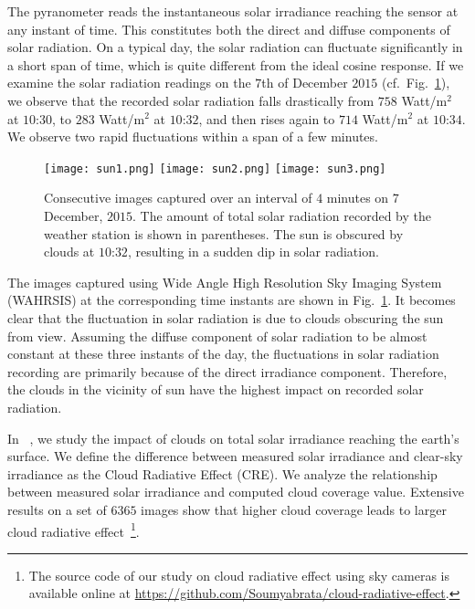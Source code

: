 The pyranometer reads the instantaneous solar irradiance reaching the sensor at any instant of time. This constitutes both the direct and diffuse components of solar radiation. On a typical day, the solar radiation can fluctuate significantly in a short span of time, which is quite different from the ideal cosine response. If we examine the solar radiation readings on the $7$th of December $2015$ (cf.\ Fig.~\ref{fig:fluctuation_example}), we observe that the recorded solar radiation falls drastically from $758$ Watt/$\mbox{m}^2$ at $10$:$30$, to $283$ Watt/$\mbox{m}^2$ at $10$:$32$, and then rises again to $714$ Watt/$\mbox{m}^2$ at $10$:$34$. We observe two rapid fluctuations within a span of a few minutes.

\begin{figure}[htb]
\begin{center}
\texttt{[image: sun1.png]}\hspace{-1mm}
\texttt{[image: sun2.png]}\hspace{-1mm}
\texttt{[image: sun3.png]}\\
\caption[Impact of clouds on direct solar irradiance.]{Consecutive images captured over an interval of $4$ minutes on $7$ December, $2015$. The amount of total solar radiation recorded by the weather station is shown in parentheses. The sun is obscured by clouds at $10$:$32$, resulting in a sudden dip in solar radiation.
\label{fig:fluctuation_example}}
\end{center}
\end{figure}

The images captured using Wide Angle High Resolution Sky Imaging System (WAHRSIS) at the corresponding time instants are shown in Fig.~\ref{fig:fluctuation_example}. It becomes clear that the fluctuation in solar radiation is due to clouds obscuring the sun from view. Assuming the diffuse component of solar radiation to be almost constant at these three instants of the day, the fluctuations in solar radiation recording are primarily because of the direct irradiance component. Therefore, the clouds in the vicinity of sun have the highest impact on recorded solar radiation.

In ~\cite{ursi2017}, we study the impact of clouds on total solar irradiance reaching the earth's surface. We define the difference between measured solar irradiance and clear-sky irradiance as the Cloud Radiative Effect (CRE). We analyze the relationship between measured solar irradiance and computed cloud coverage value. Extensive  results on a set of $6365$ images show that  higher cloud coverage leads to larger cloud radiative effect~\footnote{The source code of our study on cloud radiative effect using sky cameras is available online at \url{https://github.com/Soumyabrata/cloud-radiative-effect}.}.

